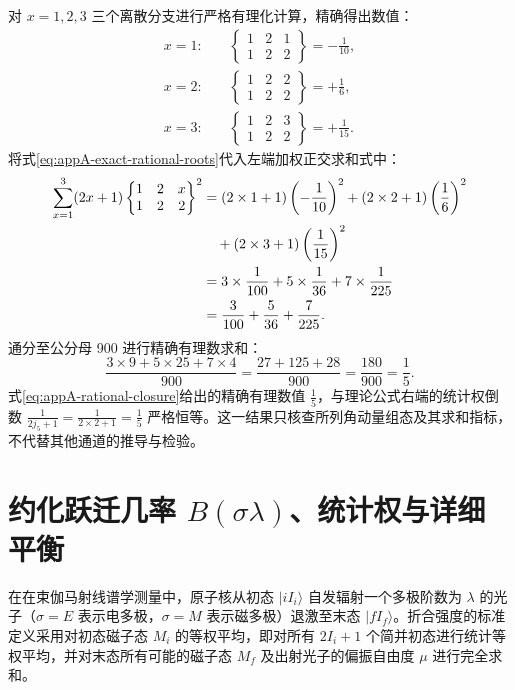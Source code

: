 对 $x=1, 2, 3$ 三个离散分支进行严格有理化计算，精确得出数值：
\begin{align}\label{eq:appA-exact-rational-roots}
x=1: \quad &\begin{Bmatrix} 1 & 2 & 1 \\ 1 & 2 & 2 \end{Bmatrix} = -\frac{1}{10} , \\
x=2: \quad &\begin{Bmatrix} 1 & 2 & 2 \\ 1 & 2 & 2 \end{Bmatrix} = +\frac{1}{6} , \\
x=3: \quad &\begin{Bmatrix} 1 & 2 & 3 \\ 1 & 2 & 2 \end{Bmatrix} = +\frac{1}{15} .
\end{align}
将式\eqref{eq:appA-exact-rational-roots}代入左端加权正交求和式中：
\begin{align}\label{eq:appA-rational-verification}
\sum_{x=1}^3 (2x + 1) \begin{Bmatrix} 1 & 2 & x \\ 1 & 2 & 2 \end{Bmatrix}^2
&= (2\times 1 + 1) \left(-\frac{1}{10}\right)^2 + (2\times 2 + 1) \left(\frac{1}{6}\right)^2 \notag \\
&\quad + (2\times 3 + 1) \left(\frac{1}{15}\right)^2 \notag \\
&= 3 \times \frac{1}{100} + 5 \times \frac{1}{36} + 7 \times \frac{1}{225} \notag \\
&= \frac{3}{100} + \frac{5}{36} + \frac{7}{225} .
\end{align}
通分至公分母 900 进行精确有理数求和：
\begin{equation}\label{eq:appA-rational-closure}
\frac{3 \times 9 + 5 \times 25 + 7 \times 4}{900} = \frac{27 + 125 + 28}{900} = \frac{180}{900} = \frac{1}{5} .
\end{equation}
式\eqref{eq:appA-rational-closure}给出的精确有理数值 $\frac{1}{5}$，与理论公式右端的统计权倒数 $\frac{1}{2j_5 + 1} = \frac{1}{2\times 2 + 1} = \frac{1}{5}$ 严格恒等。这一结果只核查所列角动量组态及其求和指标，不代替其他通道的推导与检验。

\section{约化跃迁几率 $B(\sigma\lambda)$、统计权与详细平衡}\label{sec:appA-5}

在在束伽马射线谱学测量中，原子核从初态 $|i I_i\rangle$ 自发辐射一个多极阶数为 $\lambda$ 的光子（$\sigma = E$ 表示电多极，$\sigma = M$ 表示磁多极）退激至末态 $|f I_f\rangle$。折合强度的标准定义采用对初态磁子态 $M_i$ 的等权平均，即对所有 $2I_i + 1$ 个简并初态进行统计等权平均，并对末态所有可能的磁子态 $M_f$ 及出射光子的偏振自由度 $\mu$ 进行完全求和。

